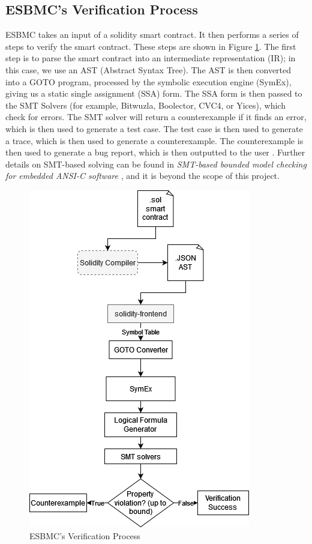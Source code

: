 \subsection{ESBMC's Verification Process}

ESBMC takes an input of a solidity smart contract. It then performs a series of steps to verify the smart contract. These steps are shown in Figure \ref{fig:ESBMC_process}. The first step is to parse the smart contract into an intermediate representation (IR); in this case, we use an AST (Abstract Syntax Tree). The AST is then converted into a GOTO program, processed by the symbolic execution engine (SymEx), giving us a static single assignment (SSA) form. The SSA form is then passed to the SMT Solvers (for example, Bitwuzla, Boolector, CVC4, or Yices), which check for errors. The SMT solver will return a counterexample if it finds an error, which is then used to generate a test case. The test case is then used to generate a trace, which is then used to generate a counterexample. The counterexample is then used to generate a bug report, which is then outputted to the user \cite{song2022esbmc}. Further details on SMT-based solving can be found in \textit{SMT-based bounded model checking for embedded ANSI-C software} \cite{cordeiro2011smt}, and it is beyond the scope of this project.


\begin{figure}[h]
\centering
\includegraphics{ESBMC_process.png}
\caption{ESBMC's Verification Process \cite{song2022esbmc}}
\label{fig:ESBMC_process}
\end{figure}